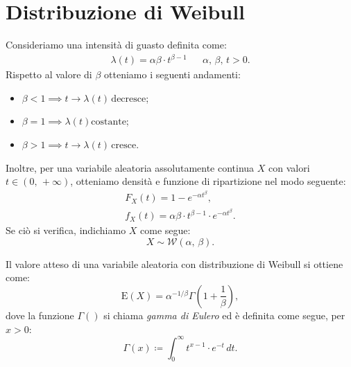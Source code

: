     \section{Distribuzione di Weibull}
        \begin{defn}\label{defn:Distribuzione_Weibull}
            Consideriamo una intensità di guasto definita come:
            \begin{align*}
                \lambda(t) = \alpha\beta \cdot t^{\beta - 1}
                & & \alpha,\, \beta,\, t > 0
            .\end{align*}
            Rispetto al valore di $\beta$ otteniamo i seguenti andamenti:
            \begin{itemize}
                \item $\beta < 1 \implies t \rightarrow \lambda(t)\, \text{decresce}$;
                \item $\beta = 1 \implies \lambda(t) \text{costante}$;
                \item $\beta > 1 \implies t \rightarrow \lambda(t)\, \text{cresce}$.
            \end{itemize}
            Inoltre, per una variabile aleatoria assolutamente continua $X$ con valori $t \in (0,\,+\infty)$, otteniamo densità e funzione di ripartizione nel modo seguente:
            \begin{gather*}
                F_X(t) = 1 - e^{-\alpha t^{\beta}}, \\
                f_X(t) = \alpha\beta \cdot t^{\beta - 1}\cdot e^{-\alpha t^{\beta}}.
            \end{gather*}
            Se ciò si verifica, indichiamo $X$ come segue: \[
                X \sim \mathcal{W}(\alpha,\, \beta)
            .\]
        \end{defn}
        \begin{obsv}
            Il valore atteso di una variabile aleatoria con distribuzione di Weibull si ottiene come: \[
                \text{E}(X) = \alpha ^{-1 /\beta} \Gamma\left(1 + \frac{1}{\beta}\right)
            ,\] dove la funzione $\Gamma()$ si chiama \emph{gamma di Eulero} ed è definita come segue, per $x > 0$: \[
            \Gamma(x) \coloneqq \int_{0}^{\infty} t^{x-1}\cdot e^{-t}\, dt
            .\] 
        \end{obsv}
